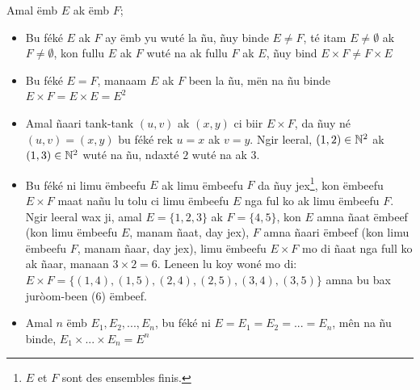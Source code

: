 \documentclass[twoside, a4paper]{article}
\begin{document}
\begin{tcolorbox}[enhanced jigsaw,breakable,pad at break*=1mm,
colback=yellow!5!white,colframe=white!75!black,title= Seetlu,
  watermark color=white]
  Amal ëmb $E$ ak ëmb $F$;
\begin{itemize}
    \item Bu féké $E$ ak $F$ ay ëmb yu wuté la ñu, ñuy binde $E\neq F$, té itam $E\neq \emptyset$ ak $F\neq \emptyset$, kon fullu $E$ ak $F$ wuté na ak fullu $F$ ak $E$, ñuy bind $E\times F \neq F \times E$
    \item Bu féké $E = F$, manaam $E$ ak $F$ been la ñu, mën na ñu binde $E\times F = E \times E = E^2$
    \item Amal ñaari tank-tank $(u, v)$ ak $(x, y)$ ci biir $E\times F$, da ñuy né $(u, v) = (x, y)$ bu féké rek $u = x$ ak $v = y$. Ngir leeral, $(1,2) \in \mathbb{N}^2$ ak $(1,3)\in \mathbb{N}^2$ wuté na ñu, ndaxté $2$ wuté na ak $3$. 
    \item Bu féké ni limu ëmbeefu $E$ ak limu ëmbeefu $F$ da ñuy jex\footnote{$E$ et $F$ sont des ensembles finis.}, kon ëmbeefu $E\times F$ maat nañu lu tolu ci limu ëmbeefu $E$ nga ful ko ak limu ëmbeefu $F$. Ngir leeral wax ji, amal $E=\{1,2,3\}$ ak $F = \{4,5\}$, kon $E$ amna ñaat ëmbeef (kon limu ëmbeefu $E$, manam ñaat, day jex), $F$ amna ñaari ëmbeef (kon limu ëmbeefu $F$, manam ñaar, day jex), limu ëmbeefu $E\times F$ mo di ñaat nga full ko ak ñaar, manaan $3\times 2=6$. Leneen lu koy woné mo di: $E\times F =\big\{(1,4), (1,5), (2,4), (2,5), (3,4), (3,5)\big\}$ amna bu bax juròom-been (6) ëmbeef.
\end{itemize}
\begin{itemize}
    \item Amal $n$ ëmb $E_1, E_2, ..., E_n$, bu féké ni $E=E_1=E_2=...=E_n$, mên na ñu binde,  $E_1 \times ... \times E_n = E^n$
\end{itemize}
\end{tcolorbox}
\end{document}
